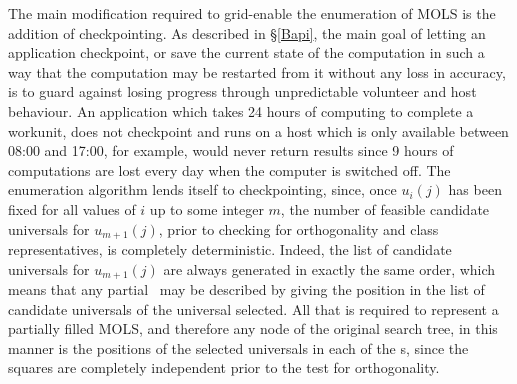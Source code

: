 The main modification required to grid-enable the   enumeration of MOLS is the addition of checkpointing. As described in \S\ref{Bapi}, the main goal of letting an application checkpoint, or save the current state of the computation in such a way that the computation may be restarted from it without any loss in accuracy, is to guard against losing progress through unpredictable volunteer and host behaviour. An application which takes 24 hours of computing to complete a workunit, does not checkpoint and runs on a host which is only available between 08:00 and 17:00, for example, would never return results since 9 hours of computations are lost every day when the computer is switched off. The enumeration algorithm lends itself to checkpointing, since, once $u_i(j)$ has been fixed for all values of $i$ up to some integer $m$, the number of feasible candidate universals for $u_{m+1}(j)$, prior to checking for orthogonality and class representatives, is completely deterministic. Indeed, the   list of candidate universals for $u_{m+1}(j)$ are always generated in exactly the same order, which means that any partial \lat \ may be described by giving the position in the list of candidate universals of the universal selected. 
All that is required to represent a partially filled MOLS, and therefore any node of the original search tree, in this manner is the positions of the selected universals in each of the \lat s, since the squares are completely independent prior to the test for orthogonality.

